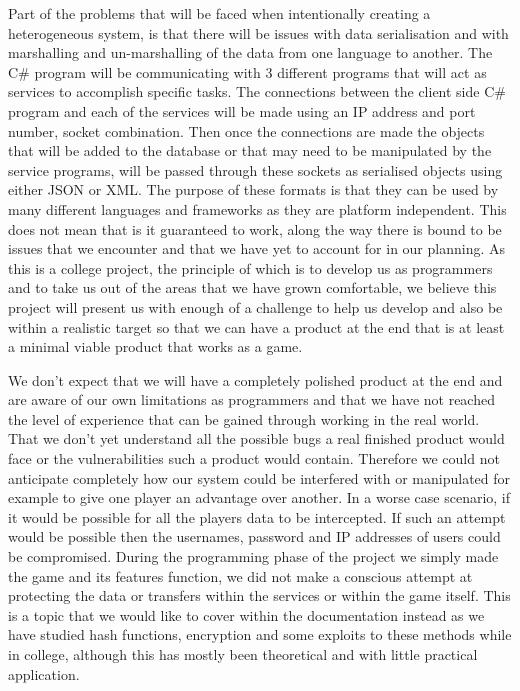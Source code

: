 Part of the problems that will be faced when intentionally creating a heterogeneous system, is that there will be issues with data serialisation and with marshalling and un-marshalling of the data from one language to another. The C\# program will be communicating with 3 different programs that will act as services to accomplish specific tasks. The connections between the client side C\# program and each of the services will be made using an IP address and port number, socket combination. Then once the connections are made the objects that will be added to the database or that may need to be manipulated by the service programs, will be passed through these sockets as serialised objects using either JSON or XML. The purpose of these formats is that they can be used by many different languages and frameworks as they are platform independent. This does not mean that is it guaranteed to work, along the way there is bound to be issues that we encounter and that we have yet to account for in our planning. As this is a college project, the principle of which is to develop us as programmers and to take us out of the areas that we have grown comfortable, we believe this project will present us with enough of a challenge to help us develop and also be within a realistic target so that we can have a product at the end that is at least a minimal viable product that works as a game. \newline

We don't expect that we will have a completely polished product at the end and are aware of our own limitations as programmers and that we have not reached the level of experience that can be gained through working in the real world. That we don't yet understand all the possible bugs a real finished product would face or the vulnerabilities such a product would contain. Therefore we could not anticipate completely how our system could be interfered with or manipulated for example to give one player an advantage over another. In a worse case scenario, if it would be possible for all the players data to be intercepted. If such an attempt would be possible then the usernames, password and IP addresses of users could be compromised. During the programming phase of the project we simply made the game and its features function, we did not make a conscious attempt at protecting the data or transfers within the services or within the game itself. This is a topic that we would like to cover within the documentation instead as we have studied hash functions, encryption and some exploits to these methods while in college, although this has mostly been theoretical and with little practical application.



